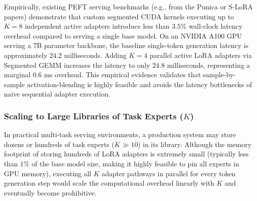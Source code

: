 Empirically, existing PEFT serving benchmarks (e.g., from the Punica \cite{punica2023} or S-LoRA \cite{slora2024} papers) demonstrate that custom segmented CUDA kernels executing up to $K=8$ independent active adapters introduce less than $3.5\%$ wall-clock latency overhead compared to serving a single base model. On an NVIDIA A100 GPU serving a 7B parameter backbone, the baseline single-token generation latency is approximately $24.2$ milliseconds. Adding $K=4$ parallel active LoRA adapters via Segmented GEMM increases the latency to only $24.8$ milliseconds, representing a marginal $0.6$ ms overhead. This empirical evidence validates that sample-by-sample activation-blending is highly feasible and avoids the latency bottlenecks of naive sequential adapter execution.

\subsubsection{Scaling to Large Libraries of Task Experts ($K$)}
In practical multi-task serving environments, a production system may store dozens or hundreds of task experts ($K \gg 10$) in its library. Although the memory footprint of storing hundreds of LoRA adapters is extremely small (typically less than $1\%$ of the base model size, making it highly feasible to pin all experts in GPU memory), executing all $K$ adapter pathways in parallel for every token generation step would scale the computational overhead linearly with $K$ and eventually become prohibitive.

